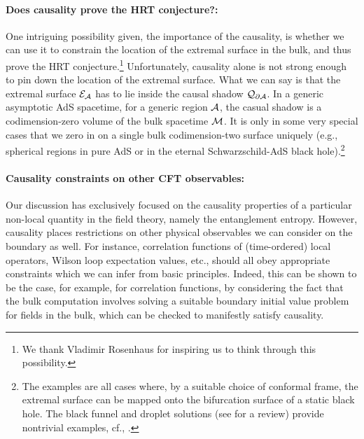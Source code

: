 \documentclass[12pt]{article}
\def\bulk{{\cal M}}
\def\regA{{\cal A}}
\def\entsurf{
\partial \regA}
\def\extr{{\cal E}_\regA}
\def\shadow{{\cal Q}}
\begin{document}
\paragraph{Does causality prove the HRT conjecture?:}  One intriguing possibility given, the importance of the causality, is whether we can use it to constrain the location of the extremal surface in the bulk, and thus prove the HRT conjecture.\footnote{ We thank Vladimir Rosenhaus for inspiring us to think through this possibility.} Unfortunately, causality alone is not strong enough to pin down the location of the extremal surface. What we can say is that the extremal surface $\extr$ has to lie inside the causal shadow $\shadow_{\entsurf}$. In a generic asymptotic AdS spacetime, for a generic region $\regA$, the casual shadow is a codimension-zero volume of the bulk spacetime $\bulk$. It is only in some very special cases that we  zero in on a single bulk codimension-two surface uniquely (e.g., spherical regions in pure AdS or in the eternal Schwarzschild-AdS black hole).\footnote{ The examples are all cases where, by a suitable choice of conformal frame, the extremal surface can be mapped onto the bifurcation surface of a static black hole. The black funnel and droplet solutions (see \cite{Marolf:2013ioa} for a review) provide nontrivial examples, cf., \cite{Hubeny:2013gba}.}


\paragraph{Causality constraints on other CFT observables:}  
Our discussion has exclusively focused on the causality properties of a particular non-local quantity in the field theory, namely the entanglement entropy. However, causality places restrictions on other physical observables we can consider on the boundary as well. For instance, correlation functions of (time-ordered) local operators, Wilson loop expectation values, etc., should all obey appropriate constraints which we can infer from basic principles. Indeed, this can be shown to be the case, for example, for correlation functions, by considering the fact that the bulk computation involves solving a suitable boundary initial value problem for fields in the bulk, which can be checked to manifestly satisfy causality. 
\end{document}
